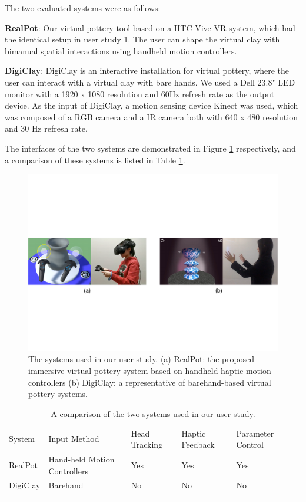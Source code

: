 \documentclass{svjour3}                     %
\begin{document}
The two evaluated systems were as follows:

\textbf{RealPot}: Our virtual pottery tool based on a HTC Vive VR system, which had the identical setup in user study 1. The user can shape the virtual clay with bimanual spatial interactions using handheld motion controllers. 

\textbf{DigiClay}: DigiClay is an interactive installation for virtual pottery, where the user can interact with a virtual clay with bare hands.
We used a Dell 23.8" LED monitor with a 1920 x 1080 resolution and 60Hz refresh rate as the output device.
As the input of DigiClay, a motion sensing device Kinect was used, which was composed of a RGB camera and a IR camera both with 640 x 480 resolution and 30 Hz refresh rate.

The interfaces of the two systems are demonstrated in Figure \ref{fig:sys} respectively, and a comparison of these systems is listed in Table \ref{tab:sys}. 


\begin{figure}
\includegraphics[width=\textwidth]{fig13}
\caption{The systems used in our user study. (a) RealPot: the proposed immersive virtual pottery system based on handheld haptic motion controllers (b) DigiClay: a representative of barehand-based virtual pottery systems.}
\label{fig:sys}
\end{figure}


\begin{table}
\caption{A comparison of the two systems used in our user study.}
\label{tab:sys}       %
\begin{tabular}{llllll}
\hline\noalign{\smallskip}
System & Input Method & Head Tracking & Haptic Feedback & Parameter Control \\
\noalign{\smallskip}\hline\noalign{\smallskip}
RealPot & Hand-held Motion Controllers & Yes & Yes & Yes\\
DigiClay & Barehand & No & No & No\\
\noalign{\smallskip}\hline
\end{tabular}
\end{table}
\end{document}
